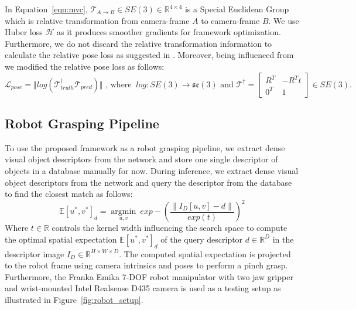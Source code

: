 In Equation~\ref{eqn:mvc}, $ \mathcal{T}_{A \rightarrow B} \in SE(3) \in \mathbb{R}^{4 \times 4}$ is a Special Euclidean Group~\cite{thurston2014three} which
is relative transformation from camera-frame $A$ to camera-frame $B$. We use Huber loss $\mathcal{H}$ as it produces smoother gradients for framework optimization.
Furthermore, we do not discard the relative transformation information to calculate the relative pose loss as suggested in \cite{suwajanakorn2018discovery}.
Moreover, being influenced from \cite{zhao2020learning} we modified the relative pose loss as follows:
\begin{equation}
    \mathcal{L}_{pose} = \Vert log(\mathcal{T}_{truth}^{\dagger} \mathcal{T}_{pred}) \Vert \text{ , where  } \ log: SE(3) \rightarrow \mathfrak{se}(3) \text{ and } \mathcal{T}^{\dagger} = \begin{bmatrix}
        R^T & -R^T t \\
        0^T & 1
    \end{bmatrix} \in SE(3).
\end{equation}


\subsection{Robot Grasping Pipeline}
To use the proposed framework as a robot grasping pipeline, we extract dense visual object descriptors from the network and store
one single descriptor of objects in a database manually for now. During inference, we extract dense visual object descriptors from the network and
query the descriptor from the database to find the closest match as follows:
\begin{equation}
    \label{eqn:gaussian_kernel}
    \mathbb{E}{[u^*, v^*]_{d}} = \operatorname*{argmin}_{u, v} \ exp-\left(\dfrac{\|I_D[u, v] - d\|}{exp(t)}\right)^2
\end{equation}
Where $t \in \mathbb{R}$ controls the kernel width influencing the search space to compute the optimal spatial expectation $\mathbb{E}{[u^*, v^*]_{d}}$ of
the query descriptor $d \in \mathbb{R}^D$ in the descriptor image $I_D \in \mathbb{R}^{H \times W \times D}$. The computed spatial expectation is projected to the robot frame using camera intrinsics and poses to perform a pinch grasp.
Furthermore, the Franka Emika 7-DOF robot manipulator with two jaw gripper and wrist-mounted Intel Realsense D435 camera is used as a testing setup as illustrated in Figure~\ref{fig:robot_setup}.

